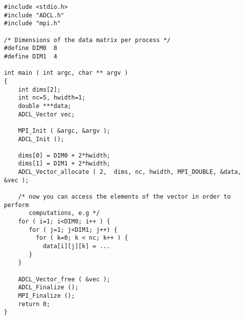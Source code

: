 \begin{verbatim}
#include <stdio.h>
#include "ADCL.h"
#include "mpi.h"

/* Dimensions of the data matrix per process */
#define DIM0  8
#define DIM1  4

int main ( int argc, char ** argv ) 
{
    int dims[2];
    int nc=5, hwidth=1;
    double ***data;
    ADCL_Vector vec;
    
    MPI_Init ( &argc, &argv );
    ADCL_Init ();
    
    dims[0] = DIM0 + 2*hwidth;
    dims[1] = DIM1 + 2*hwidth;
    ADCL_Vector_allocate ( 2,  dims, nc, hwidth, MPI_DOUBLE, &data, &vec );
    
    /* now you can access the elements of the vector in order to perform 
       computations, e.g */
    for ( i=1; i<DIM0; i++ ) {
       for ( j=1; j<DIM1; j++) {
         for ( k=0; k < nc; k++ ) {
           data[i][j][k] = ...
       }
    }
    
    ADCL_Vector_free ( &vec );        
    ADCL_Finalize ();
    MPI_Finalize ();
    return 0;
}
\end{verbatim}

